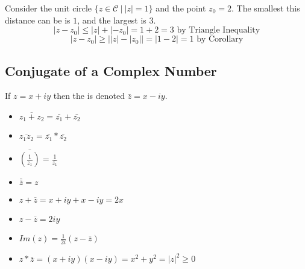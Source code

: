 \documentclass[12pt]{scrartcl}
\newcommand{\C}{\mathcal{C}}
\begin{document}
\begin{example}
  Consider the unit circle $\{z \in \C \ | \ |z| = 1\}$ and the point $z_0 = 2$. The smallest this distance can be is $1$, 
  and the largest is $3$.
  \[|z - z_0| \leq |z| + |-z_0| = 1 + 2 = 3 \text{ by Triangle Inequality}\]
  \[|z-z_0| \geq \left| |z| - |z_0| \right| = |1 - 2| = 1 \text{ by Corollary}\]
\end{example}

\subsection{Conjugate of a Complex Number}

\begin{definition}
    If $z = x + iy$ then the  is denoted $\bar{z} = x - iy$.
\end{definition}

\begin{note}
  
  \hfill

  \begin{itemize}
    \item $\overline{z_1 + z_2} = \bar{z_1} + \bar{z_2}$
    \item $\overline{z_1z_2} = \bar{z_1} * \bar{z_2}$
    \item $\bar{(\frac{1}{z_1})} = \frac{1}{\bar{z_1}}$
    \item $\overline{\bar{z}} = z$
  \end{itemize}

\end{note}

\begin{remark}
  
  \hfill

  \begin{itemize}
    \item $z + \overline{z} = x + iy + x - iy = 2x$
    \item $z - \overline{z} = 2iy$
    \item $Im(z) = \frac{1}{2i}(z - \bar{z})$
    \item $z * \bar{z} = (x + iy)(x - iy) = x^2 + y^2 = |z|^2 \geq 0$
  \end{itemize}
\end{remark}
\end{document}
